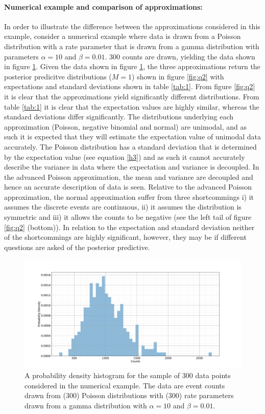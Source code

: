 \begin{example}
	\paragraph{Numerical example and comparison of approximations: } In order to illustrate the difference between the approximations considered in this example, consider a numerical example where data is drawn from a Poisson distribution with a rate parameter that is drawn from a gamma distribution with parameters $\alpha = 10$ and $\beta =  0.01$. $300$ counts are drawn, yielding the data shown in figure \ref{fig:q1}. Given the data shown in figure \ref{fig:q1}, the three approximations return the posterior predicitve distributions ($M=1$) shown in figure \ref{fig:q2} with expectations and standard deviations shown in table \ref{tab:1}. From figure \ref{fig:q2} it is clear that the approximations yield significantly different distributions. From table \ref{tab:1} it is clear that the expectation values are highly similar, whereas the standard deviations differ significantly. The distributions underlying each approximation (Poisson, negative binomial and normal) are unimodal, and as such it is expected that they will estimate the expectation value of unimodal data accurately. The Poisson distribution has a standard deviation that is determined by the expectation value (see equation \eqref{h3}) and as such it cannot accurately describe the variance in data where the expectation and variance is decoupled. In the advanced Poisson approximation, the mean and variance are decoupled and hence an accurate description of data is seen. Relative to the advanced Poisson approximation, the normal approximation suffer from three shortcommings i) it assumes the discrete events are continuous, ii) it assumes the distribution is symmetric and iii) it allows the counts to be negative (see the left tail of figure \ref{fig:q2} (bottom)). In relation to the expectation and standard deviation neither of the shortcommings are highly significant, however, they may be if different questions are asked of the posterior predictive.	
	\begin{figure}[H]
		\centering
		\includegraphics[width = 1\textwidth]{figures/count_hist.pdf}
		\caption{A probability density histogram for the sample of $300$ data points considered in the numerical example. The data are event counts drawn from ($300$) Poisson distributions with ($300$) rate parameters drawn from a gamma distribution with $\alpha = 10$ and $\beta =  0.01$.}
		\label{fig:q1}
	\end{figure}
	

\end{example}
